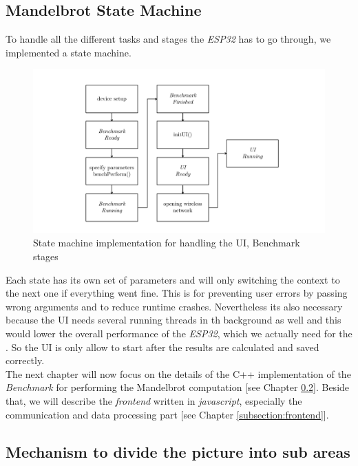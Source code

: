 \subsection{Mandelbrot State Machine}

To handle all the different tasks and stages the \textit{ESP32} has to go through, we implemented a state machine.

\begin{figure}[htbp]
	\centerline{\includegraphics[width=1.1\linewidth]{images/State-Machine.pdf}}
	\caption{ State machine implementation for handling the UI, Benchmark stages }
	\label{fig:stateMachine}
\end{figure}  

Each state has its own set of parameters and will only switching the context to the next one if everything went fine. This is for preventing user errors by passing wrong arguments and to reduce runtime crashes. Nevertheless its also necessary because the UI needs several running threads in th background as well and this would lower the overall performance of the \textit{ESP32}, which we actually need for the . So the UI is only allow to start after the results are calculated and saved correctly.\\   

\noindent The next chapter will now focus on the details of the C++ implementation of the \textit{Benchmark} for performing the Mandelbrot computation [see Chapter \ref{subsection:subImages}]. Beside that, we will describe the \textit{frontend} written in \textit{javascript}, especially the communication and data processing part [see Chapter \ref{subsection:frontend}]. 

\newpage

\subsection{Mechanism to divide the picture into sub areas} \label{subsection:subImages}

